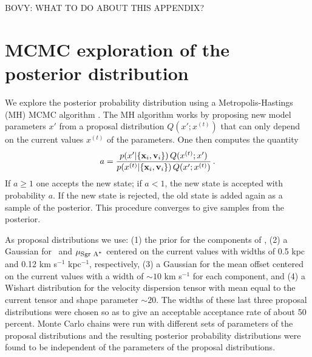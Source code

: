 BOVY: WHAT TO DO ABOUT THIS APPENDIX?

\section{MCMC exploration of the posterior distribution}\label{sec:mcmc}

We explore the posterior probability distribution using a
Metropolis-Hastings (MH) MCMC algorithm \citep[\eg,][]{mackay}. The MH
algorithm works by proposing new model parameters $x'$ from a proposal
distribution $Q(x';x^{(t)})$ that can only depend on the current
values $x^{(t)}$ of the parameters. One then computes the quantity
\begin{equation}
a =
\frac{p(x'|\{\boldsymbol{\mathbf{x}}_i,\boldsymbol{\mathbf{v}}_i\})\,Q(x^{(t)};x')}{p(x^{(t)}|\{\boldsymbol{\mathbf{x}}_i,\boldsymbol{\mathbf{v}}_i\})\,Q(x';x^{(t)})}\,.
\end{equation}
If $a \geq 1$ one accepts the new state; if $a < 1$, the new state is
accepted with probability $a$. If the new state is rejected, the old
state is added again as a sample of the posterior. This procedure
converges to give samples from the posterior.

As proposal distributions we use: (1) the prior for the components of
\vsunlsr, (2) a Gaussian for \Ro\ and $\mu_{\mbox{{\footnotesize Sgr A$^*$}}}$ centered on the
current values with widths of 0.5 kpc and 0.12 km s$^{-1}$ kpc$^{-1}$,
respectively, (3) a Gaussian for the mean offset centered on the
current values with a width of $\sim\!10$ km s$^{-1}$ for each
component, and (4) a Wishart distribution for the velocity dispersion
tensor with mean equal to the current tensor and shape parameter
$\sim\!20$. The widths of these last three proposal distributions were
chosen so as to give an acceptable acceptance rate of about
50\,percent. Monte Carlo chains were run with different sets of
parameters of the proposal distributions and the resulting posterior
probability distributions were found to be independent of the
parameters of the proposal distributions.


